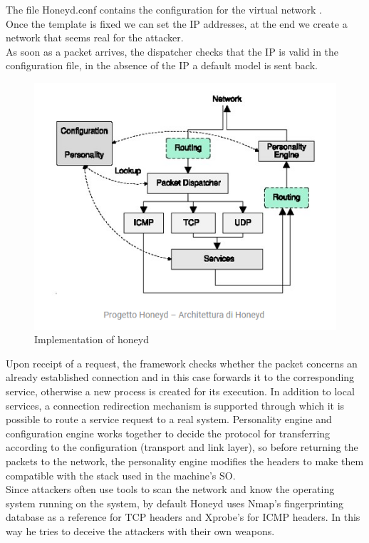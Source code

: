 \FloatBarrier
The file Honeyd.conf contains the configuration for the virtual network .\\
Once the template is fixed we can set the IP addresses, at the end we create a network that seems real for the attacker.\\

As soon as a packet arrives, the dispatcher checks that the IP is valid in the configuration file, in the absence of the IP a default model is sent back.
\begin{figure}[h!]
  \centering
  \includegraphics{images/honeyd.png}
  \caption{Implementation of  honeyd}
  \label{fig:irradiances}
\end{figure}
\FloatBarrier
Upon receipt of a request, the framework checks whether the packet concerns an already established connection and in this case forwards it to the corresponding service, otherwise a new process is created for its execution. In addition to local services, a connection redirection mechanism is supported through which it is possible to route a service request to a real system.
Personality engine and configuration engine works together to decide the protocol for transferring according to the configuration (transport and link layer), so before returning the packets to the network, the personality engine modifies the headers to make them compatible with the stack used in the machine's SO.\\
Since attackers often use tools to scan the network and know the operating system running on the system, by default Honeyd uses Nmap's fingerprinting database as a reference for TCP headers and Xprobe's for ICMP headers. In this way he tries to deceive the attackers with their own weapons.
